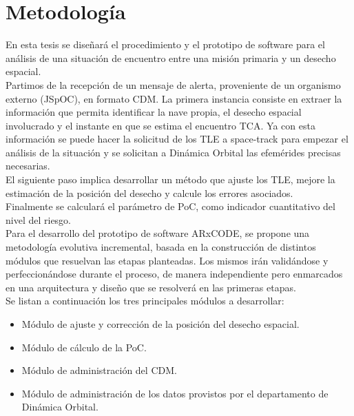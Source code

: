 \chapter{Metodología}
\label{chap:metodologia}



 
En esta tesis se dise\~nar\'a el procedimiento y el prototipo de software para el an\'alisis de una situaci\'on de encuentro entre una misi\'on primaria y un desecho espacial.\\
Partimos de la recepci\'on de un mensaje de alerta, proveniente de un organismo externo (JSpOC), en formato CDM. La primera instancia consiste en extraer la informaci\'on que permita identificar la nave propia, el desecho espacial involucrado y el instante en que se estima el encuentro \ac{TCA}. Ya con esta informaci\'on se puede hacer la solicitud de los TLE a space-track para empezar el an\'alisis de la situaci\'on y se solicitan a Din\'amica Orbital las efem\'erides precisas necesarias.\\
El siguiente paso implica desarrollar un m\'etodo que ajuste los TLE, mejore la estimaci\'on de la posici\'on del desecho y calcule los errores asociados.\\
Finalmente se calcular\'a el par\'ametro de \ac{PoC}, como indicador cuantitativo del nivel del riesgo.\\

Para el desarrollo del prototipo de software ARxCODE, se propone una metodolog\'ia evolutiva incremental, basada en la construcci\'on de distintos m\'odulos que resuelvan las etapas planteadas. Los mismos ir\'an valid\'andose y perfeccion\'andose durante el proceso, de manera independiente pero enmarcados en una arquitectura y dise\~no que se resolver\'a en las primeras etapas.\\
Se listan a continuaci\'on los tres principales m\'odulos a desarrollar:\\ 

\begin{itemize}
\item M\'odulo de ajuste y correcci\'on de la posici\'on del desecho espacial.\\
\item M\'odulo de c\'alculo de la PoC.\\
\item M\'odulo de administraci\'on del CDM.\\
\item M\'odulo de administraci\'on de los datos provistos por el departamento de Din\'amica Orbital.\\
\end{itemize}


